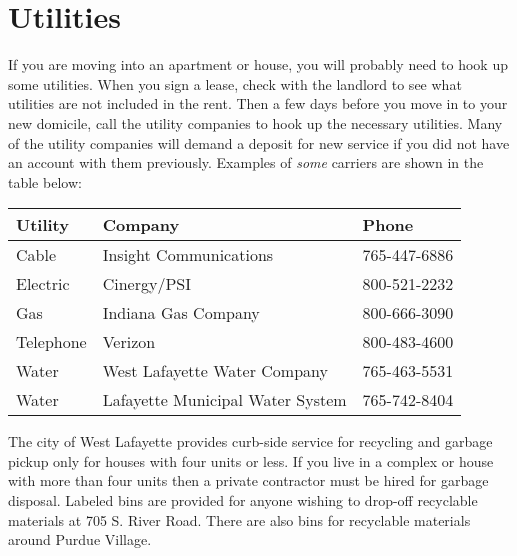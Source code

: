 \section{Utilities}

If you are moving into an apartment or house, you will probably need to hook up some utilities. When you sign a lease, check with the landlord to see what utilities are not included in the rent. Then a few days before you move in to your new domicile, call the utility companies to hook up the necessary utilities. Many of the utility companies will demand a deposit for new service if you did not have an account with them previously. Examples of \emph{some} carriers are shown in the table below:

\begin{table}[h]
	\centering
	\begin{tabular}{@{}lll@{}}
		\toprule
		\textbf{Utility} & \textbf{Company} & \textbf{Phone} \\
		\midrule
		Cable & Insight Communications & 765-447-6886 \\
		Electric & Cinergy/PSI & 800-521-2232 \\
		Gas & Indiana Gas Company & 800-666-3090 \\
		Telephone & Verizon & 800-483-4600 \\
		Water & West Lafayette Water Company & 765-463-5531 \\
		Water & Lafayette Municipal Water System & 765-742-8404 \\
		\bottomrule
	\end{tabular}
\end{table}


The city of West Lafayette provides curb-side service for recycling and garbage pickup only for houses with four units or less. If you live in a complex or house with more than four units then a private contractor must be hired for garbage disposal. Labeled bins are provided for anyone wishing to drop-off recyclable materials at 705 S. River Road. There are also bins for recyclable materials around Purdue Village.